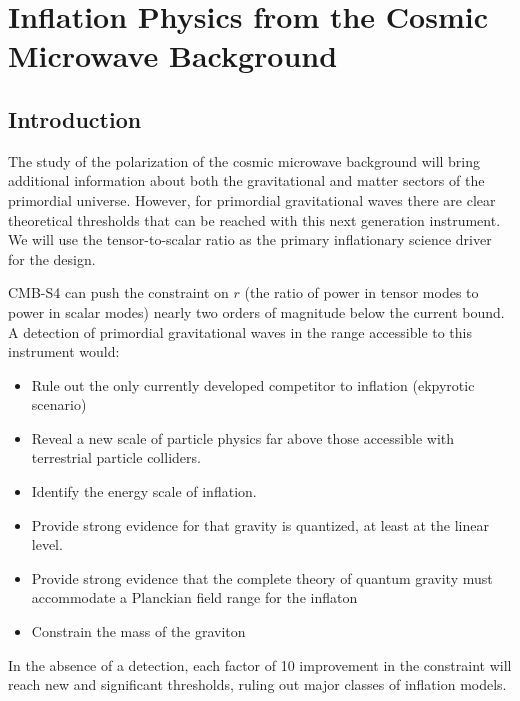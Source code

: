  
\chapter{Inflation Physics from the Cosmic Microwave Background}
\renewcommand*\thesection{\arabic{section}}

\def\gtrsim{\raise-.75ex\hbox{$\buildrel>\over\sim$}}

\section{Introduction}
The study of the polarization of the cosmic microwave background will bring additional information about both the gravitational and matter sectors of the primordial universe. However, for primordial gravitational waves there are clear theoretical thresholds that can be reached with this next generation instrument. We will use the tensor-to-scalar ratio as the primary inflationary science driver for the design.

CMB-S4 can push the constraint on $r$ (the ratio of power in tensor modes to power in scalar modes) nearly two orders of magnitude below the current bound.  A detection of primordial gravitational waves in the range accessible to this instrument would:
\begin{itemize}
\item  Rule out the only currently developed competitor to inflation (ekpyrotic scenario)
 \item Reveal a new scale of particle physics far above those accessible with terrestrial particle colliders. 
 \item Identify the energy scale of inflation. 
\item  Provide strong evidence for that gravity is quantized, at least at the linear level.
\item	 Provide strong evidence that the complete theory of quantum gravity must accommodate a Planckian field range for the inflaton
\item  Constrain the mass of the graviton 
\end{itemize}
In the absence of a detection, each factor of 10 improvement in the constraint will reach new and significant thresholds, ruling out major classes of inflation models. 


